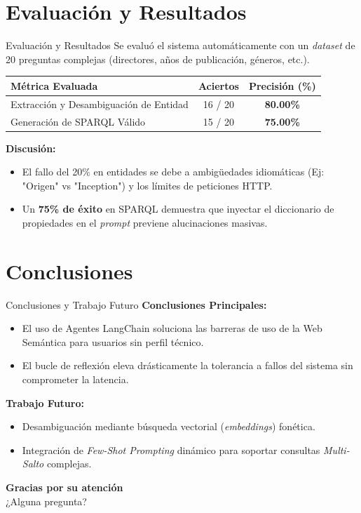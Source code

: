 \documentclass[11pt,aspectratio=169]{beamer}
\begin{document}
\section{Evaluación y Resultados}
\begin{frame}{Evaluación y Resultados}
  Se evaluó el sistema automáticamente con un \textit{dataset} de 20 preguntas complejas (directores, años de publicación, géneros, etc.).
  
  \vspace{0.4cm}
  \begin{table}[]
    \centering
    \begin{tabular}{|l|c|c|}
    \hline
    \textbf{Métrica Evaluada} & \textbf{Aciertos} & \textbf{Precisión (\%)} \\ \hline
    Extracción y Desambiguación de Entidad & 16 / 20 & \textbf{80.00\%} \\ \hline
    Generación de SPARQL Válido & 15 / 20 & \textbf{75.00\%} \\ \hline
    \end{tabular}
  \end{table}
  \vspace{0.3cm}

  \textbf{Discusión:}
  \begin{itemize}
    \item El fallo del 20\% en entidades se debe a ambigüedades idiomáticas (Ej: "Origen" vs "Inception") y los límites de peticiones HTTP.
    \item Un \textbf{75\% de éxito} en SPARQL demuestra que inyectar el diccionario de propiedades en el \textit{prompt} previene alucinaciones masivas.
  \end{itemize}
\end{frame}

\section{Conclusiones}
\begin{frame}{Conclusiones y Trabajo Futuro}
  \textbf{Conclusiones Principales:}
  \begin{itemize}
    \item El uso de Agentes LangChain soluciona las barreras de uso de la Web Semántica para usuarios sin perfil técnico.
    \item El bucle de reflexión eleva drásticamente la tolerancia a fallos del sistema sin comprometer la latencia.
  \end{itemize}
  
  \vspace{0.5cm}
  \textbf{Trabajo Futuro:}
  \begin{itemize}
    \item Desambiguación mediante búsqueda vectorial (\textit{embeddings}) fonética.
    \item Integración de \textit{Few-Shot Prompting} dinámico para soportar consultas \textit{Multi-Salto} complejas.
  \end{itemize}
\end{frame}

\begin{frame}
  \begin{center}
    \Huge \textbf{Gracias por su atención}\\
    \vspace{1.5cm}
    \Large ¿Alguna pregunta?
  \end{center}
\end{frame}
\end{document}
